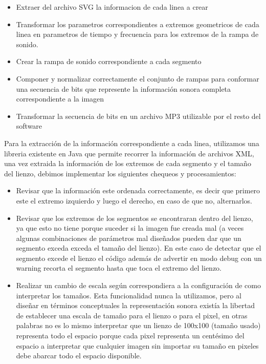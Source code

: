 \documentclass{article}
\begin{document}
    \begin{itemize}
        \item Extraer del archivo SVG la informacion de cada linea a crear
        \item Transformar los parametros correspondientes a extremos geometricos de cada linea en parametros de tiempo y frecuencia para los extremos de la rampa de sonido.
        \item Crear la rampa de sonido correspondiente a cada segmento
        \item Componer y normalizar correctamente el conjunto de rampas para conformar una secuencia de bits que represente la información sonora completa correspondiente a la imagen
        \item Transformar la secuencia de bits en un archivo MP3 utilizable por el resto del software
    \end{itemize}
    
    Para la extracción de la información correspondiente a cada linea, utilizamos una libreria existente en Java que permite recorrer la información de archivos XML, una vez extraida la información de los extremos de cada segmento y el tamaño del lienzo, debimos implementar los siguientes chequeos y procesamientos:
    
    \begin{itemize}
        \item Revisar que la información este ordenada correctamente, es decir que primero este el extremo izquierdo y luego el derecho, en caso de que no, alternarlos. 
        \item Revisar que los extremos de los segmentos se encontraran dentro del lienzo, ya que esto no tiene porque suceder si la imagen fue creada mal (a veces algunas combinaciones de parámetros mal diseñados pueden dar que un segmento exceda exceda el tamaño del lienzo). En este caso de detectar que el segmento excede el lienzo el código además de advertir en modo debug con un warning recorta el segmento hasta que toca el extremo del lienzo.
        \item Realizar un cambio de escala según correspondiera a la configuración de como interpretar los tamaños. Esta funcionalidad nunca la utilizamos, pero al diseñar en términos conceptuales la representación sonora existía la libertad de establecer una escala de tamaño para el lienzo o para el pixel, en otras palabras no es lo mismo interpretar que un lienzo de 100x100 (tamaño usado) representa todo el espacio porque cada pixel representa un centésimo del espacio a interpretar que cualquier imagen sin importar su tamaño en pixeles debe abarcar todo el espacio disponible. 
    \end{itemize}
    
\end{document}
